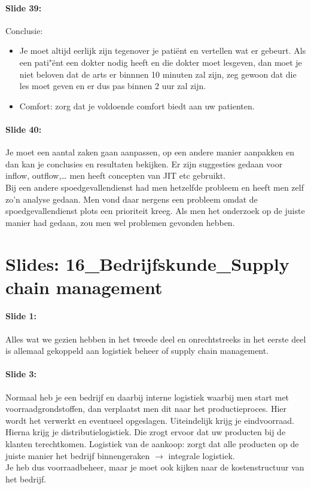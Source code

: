 \documentclass[10pt,a4paper]{report}
\begin{document}
\paragraph{Slide 39:} Conclusie: 
\begin{itemize}
\item Je moet altijd eerlijk zijn tegenover je pati\"ent en vertellen wat er gebeurt. Als een pati"\"ent een dokter nodig heeft en die dokter moet lesgeven, dan moet je niet beloven dat de arts er binnnen 10 minuten zal zijn, zeg gewoon dat die les moet geven en er dus pas binnen 2 uur zal zijn. 
\item Comfort: zorg dat je voldoende comfort biedt aan uw patienten.
\end{itemize}

\paragraph{Slide 40:} Je moet een aantal zaken gaan aanpassen, op een andere manier aanpakken en dan kan je conclusies en resultaten bekijken. Er zijn suggesties gedaan voor inflow, outflow,… men heeft concepten van JIT etc gebruikt.\\
Bij een andere spoedgevallendienst had men hetzelfde probleem en heeft men zelf zo'n analyse gedaan. Men vond daar nergens een probleem omdat de spoedgevallendienst plots een prioriteit kreeg. Als men het onderzoek op de juiste manier had gedaan, zou men wel problemen gevonden hebben.

\section{Slides: 16\_Bedrijfskunde\_Supply chain management}

\paragraph{Slide 1:} Alles wat we gezien hebben in het tweede deel en onrechtstreeks in het eerste deel is allemaal gekoppeld aan logistiek beheer of supply chain management.

\paragraph{Slide 3:} Normaal heb je een bedrijf en daarbij interne logistiek waarbij men start met voorraadgrondstoffen, dan verplaatst men dit naar het productieproces. Hier wordt het verwerkt en eventueel opgeslagen. Uiteindelijk krijg je eindvoorraad. Hierna krijg je distributielogistiek. Die zrogt ervoor dat uw producten bij de klanten terechtkomen. Logistiek van de aankoop: zorgt dat alle producten op de juiste manier het bedrijf binnengeraken $\rightarrow$ integrale logistiek.\\
Je heb dus voorraadbeheer, maar je moet ook kijken naar de kostenstructuur van het bedrijf. 
\end{document}
